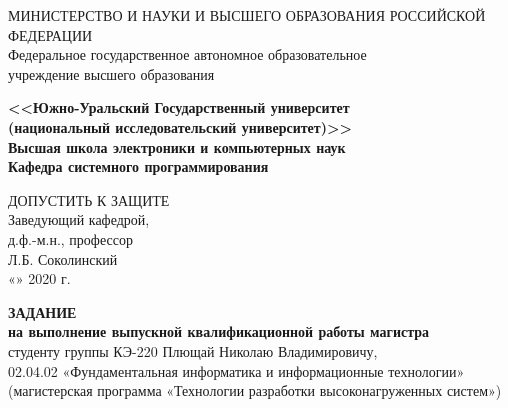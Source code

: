 \begin{titlepage}
    
    \begin{center}
        МИНИСТЕРСТВО И НАУКИ И ВЫСШЕГО ОБРАЗОВАНИЯ РОССИЙСКОЙ ФЕДЕРАЦИИ\\
        Федеральное государственное автономное образовательное\\
        учреждение высшего образования

        \textbf{
        <<Южно-Уральский Государственный университет\\
        (национальный исследовательский университет)>>\\
        Высшая школа электроники и компьютерных наук\\
        Кафедра системного программирования
        }
        \bigskip
    \end{center}

    \hfill
    \begin{minipage}{0.4\textwidth}
        ДОПУСТИТЬ К ЗАЩИТЕ\\
        Заведующий кафедрой,\\
        д.ф.-м.н., профессор\\
        \underline{\hspace{2cm}} Л.Б. Соколинский\\
        «\underline{\hspace{0.7cm}}» \underline{\hspace{2cm}} 2020 г.
    \end{minipage}

    \begin{center}
        \textbf{ЗАДАНИЕ}\\
        \textbf{на выполнение выпускной квалификационной работы магистра}\\
        студенту группы КЭ-220 Плющай Николаю Владимировичу,\\
        02.04.02 «Фундаментальная информатика и информационные технологии»\\
        (магистерская программа «Технологии разработки высоконагруженных систем»)\\
    \end{center}


\end{titlepage}
